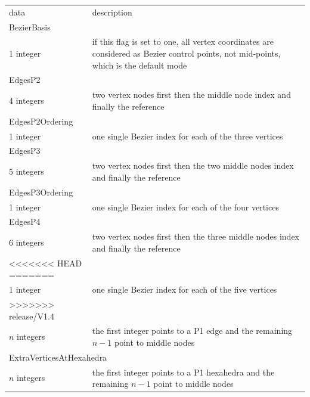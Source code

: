 \documentclass[a4paper,12pt]{article}
\begin{document}
\setlongtables
\begin{longtable}{|m{4cm}|m{11cm}|}
\endhead
\endfoot

\hline
\multicolumn{2}{|l|}{keyword} \\
\hline
data & description \\
\hline\hline

\multicolumn{2}{|l|}{BezierBasis} \\
\hline
1 integer & if this flag is set to one, all vertex coordinates are considered as Bezier control points, not mid-points, which is the default mode \\
\hline\hline

\multicolumn{2}{|l|}{EdgesP2} \\
\hline
4 integers & two vertex nodes first then the middle node index and finally the reference \\
\hline\hline

\multicolumn{2}{|l|}{EdgesP2Ordering} \\
\hline
1 integer & one single Bezier index for each of the three vertices \\
\hline\hline

\multicolumn{2}{|l|}{EdgesP3} \\
\hline
5 integers & two vertex nodes first then the two middle nodes index and finally the reference \\
\hline\hline

\multicolumn{2}{|l|}{EdgesP3Ordering} \\
\hline
1 integer & one single Bezier index for each of the four vertices \\
\hline\hline

\multicolumn{2}{|l|}{EdgesP4} \\
\hline
6 integers & two vertex nodes first then the three middle nodes index and finally the reference \\
<<<<<<< HEAD
=======
\hline\hline

\multicolumn{2}{|l|}{EdgesP4Ordering} \\
\hline
1 integer & one single Bezier index for each of the five vertices \\
>>>>>>> release/V1.4
\hline\hline

\multicolumn{2}{|l|}{ExtraVerticesAtEdges} \\
\hline
$n$ integers & the first integer points to a P1 edge and the remaining $n-1$ point to middle nodes \\
\hline\hline

\multicolumn{2}{|l|}{ExtraVerticesAtHexahedra} \\
\hline
$n$ integers & the first integer points to a P1 hexahedra and the remaining $n-1$ point to middle nodes \\
\hline\hline


\end{longtable}
\end{document}
